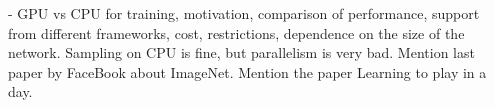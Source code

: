 
- GPU vs CPU for training, motivation, comparison of performance, support
  from different frameworks, cost, restrictions, dependence on the size of
  the network. Sampling on CPU is fine, but parallelism is very bad.
  Mention last paper by FaceBook about ImageNet. Mention the paper Learning
  to play in a day.
